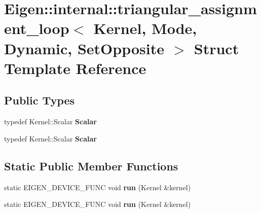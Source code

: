 \hypertarget{struct_eigen_1_1internal_1_1triangular__assignment__loop_3_01_kernel_00_01_mode_00_01_dynamic_00_01_set_opposite_01_4}{}\section{Eigen\+:\+:internal\+:\+:triangular\+\_\+assignment\+\_\+loop$<$ Kernel, Mode, Dynamic, Set\+Opposite $>$ Struct Template Reference}
\label{struct_eigen_1_1internal_1_1triangular__assignment__loop_3_01_kernel_00_01_mode_00_01_dynamic_00_01_set_opposite_01_4}
\subsection*{Public Types}
\begin{DoxyCompactItemize}
\item 
\mbox{\label{struct_eigen_1_1internal_1_1triangular__assignment__loop_3_01_kernel_00_01_mode_00_01_dynamic_00_01_set_opposite_01_4_a6bf5755b404347b4d5047db18d2e1a95}} 
typedef Kernel\+::\+Scalar {\bfseries Scalar}
\item 
\mbox{\label{struct_eigen_1_1internal_1_1triangular__assignment__loop_3_01_kernel_00_01_mode_00_01_dynamic_00_01_set_opposite_01_4_a6bf5755b404347b4d5047db18d2e1a95}} 
typedef Kernel\+::\+Scalar {\bfseries Scalar}
\end{DoxyCompactItemize}
\subsection*{Static Public Member Functions}
\begin{DoxyCompactItemize}
\item 
\mbox{\label{struct_eigen_1_1internal_1_1triangular__assignment__loop_3_01_kernel_00_01_mode_00_01_dynamic_00_01_set_opposite_01_4_a3f585656bbe3843283d82df37ee5ac34}} 
static E\+I\+G\+E\+N\+\_\+\+D\+E\+V\+I\+C\+E\+\_\+\+F\+U\+NC void {\bfseries run} (Kernel \&kernel)
\item 
\mbox{\label{struct_eigen_1_1internal_1_1triangular__assignment__loop_3_01_kernel_00_01_mode_00_01_dynamic_00_01_set_opposite_01_4_a3f585656bbe3843283d82df37ee5ac34}} 
static E\+I\+G\+E\+N\+\_\+\+D\+E\+V\+I\+C\+E\+\_\+\+F\+U\+NC void {\bfseries run} (Kernel \&kernel)
\end{DoxyCompactItemize}


